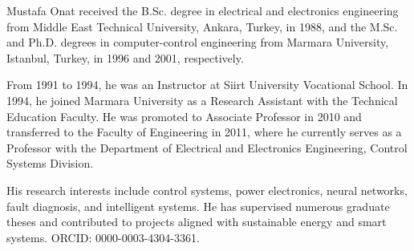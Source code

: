 \documentclass[preprint,review,12pt]{elsarticle}
\begin{document}
\begin{biography}{Mustafa Onat}
received the B.Sc. degree in electrical and electronics engineering from Middle East Technical University, Ankara, Turkey, in 1988, and the M.Sc. and Ph.D. degrees in computer-control engineering from Marmara University, Istanbul, Turkey, in 1996 and 2001, respectively.

From 1991 to 1994, he was an Instructor at Siirt University Vocational School. In 1994, he joined Marmara University as a Research Assistant with the Technical Education Faculty. He was promoted to Associate Professor in 2010 and transferred to the Faculty of Engineering in 2011, where he currently serves as a Professor with the Department of Electrical and Electronics Engineering, Control Systems Division.

His research interests include control systems, power electronics, neural networks, fault diagnosis, and intelligent systems. He has supervised numerous graduate theses and contributed to projects aligned with sustainable energy and smart systems. ORCID: 0000-0003-4304-3361.
\end{biography}
\end{document}
